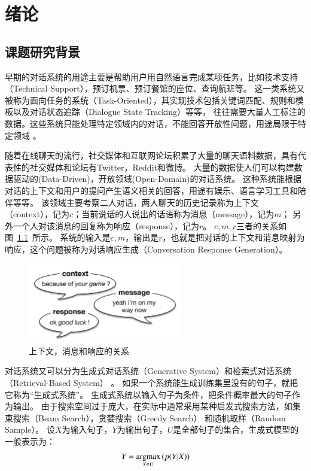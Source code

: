 
\chapter{绪论}\label{ch:introduction}

\section{课题研究背景}\label{sec:research_background}
早期的对话系统的用途主要是帮助用户用自然语言完成某项任务，比如技术支持（Technical Support），预订机票、预订餐馆的座位、查询航班等。
这一类系统又被称为面向任务的系统（Task-Oriented），其实现技术包括关键词匹配、规则和模板以及对话状态追踪（Dialogue State Tracking）等等，
往往需要大量人工标注的数据。这些系统只能处理特定领域内的对话，不能回答开放性问题，用途局限于特定领域
。

随着在线聊天的流行，社交媒体和互联网论坛积累了大量的聊天语料数据，具有代表性的社交媒体和论坛有Twitter，Reddit和微博。
大量的数据使人们可以构建数据驱动的(Data-Driven)，开放领域(Open-Domain)的对话系统。
这种系统能根据对话的上下文和用户的提问产生语义相关的回答，用途有娱乐、语言学习工具和陪伴等等。
该领域主要考察二人对话，两人聊天的历史记录称为上下文（context），记为$c$；当前说话的人说出的话语称为消息（message），记为$m$；
另外一个人对该消息的回复称为响应（response），记为$r$。
$c,m,r$三者的关系如图~\ref{fig:context_message_response}~所示。
系统的输入是$c,m$，输出是$r$，也就是把对话的上下文和消息映射为响应，这个问题被称为对话响应生成（Conversation Response Generation）。

\begin{figure}[H]
    \includegraphics[width=0.6\textwidth]{figure/context_message_response.png}
    \centering
    \caption{上下文，消息和响应的关系}
    \label{fig:context_message_response}
\end{figure}

对话系统又可以分为生成式对话系统（Generative System）和检索式对话系统（Retrieval-Based System）
。
如果一个系统能生成训练集里没有的句子，就把它称为“生成式系统”。
生成式系统以输入句子为条件，把条件概率最大的句子作为输出。
由于搜索空间过于庞大，在实际中通常采用某种启发式搜索方法，如集束搜索（Beam Search），贪婪搜索（Greedy Search）
和随机取样（Random Sample）。
设$X$为输入句子，$Y$为输出句子，$U$是全部句子的集合，生成式模型的一般表示为：
\begin{align}
    Y = \operatorname*{argmax}_{Y\in U} \left(p(Y|X)\right)
\end{align}

